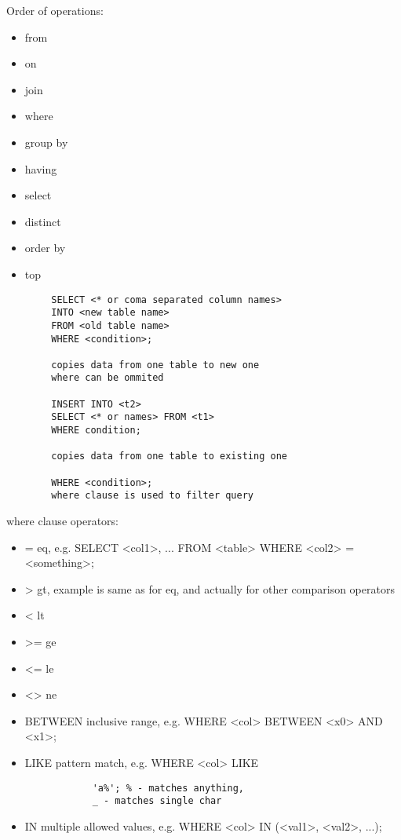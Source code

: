 \documentclass{article}
\begin{document}
    Order of operations:
    \begin{itemize}
        \item from
        \item on
        \item join
        \item where
        \item group by
        \item having
        \item select
        \item distinct
        \item order by
        \item top
    \end{itemize}

    \begin{verbatim}
        SELECT <* or coma separated column names>
        INTO <new table name>
        FROM <old table name>
        WHERE <condition>;

        copies data from one table to new one
        where can be ommited

        INSERT INTO <t2>
        SELECT <* or names> FROM <t1>
        WHERE condition;

        copies data from one table to existing one

        WHERE <condition>;
        where clause is used to filter query
    \end{verbatim}

    where clause operators:
    \begin{itemize}
        \item = eq, e.g. SELECT <col1>, ... FROM <table> WHERE <col2> = <something>;
        \item > gt, example is same as for eq, and actually for other comparison operators
        \item < lt
        \item >= ge
        \item <= le
        \item <> ne
        \item BETWEEN inclusive range, e.g. WHERE <col> BETWEEN <x0> AND <x1>;
        \item LIKE pattern match, e.g. WHERE <col> LIKE \begin{verbatim}
            'a%'; % - matches anything,
            _ - matches single char
        \end{verbatim}
        \item IN multiple allowed values, e.g. WHERE <col> IN (<val1>, <val2>, ...);
    \end{itemize}
\end{document}
